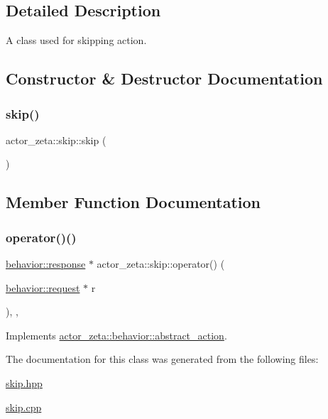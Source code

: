 \subsection{Detailed Description}
A class used for skipping action. 

\subsection{Constructor \& Destructor Documentation}
\mbox{\label{classactor__zeta_1_1skip_a2a649385cc43b90561bbd106aadf55fe}} 
\subsubsection{\texorpdfstring{skip()}{skip()}}
{\footnotesize\ttfamily actor\+\_\+zeta\+::skip\+::skip (\begin{DoxyParamCaption}{ }\end{DoxyParamCaption})}



\subsection{Member Function Documentation}
\mbox{\label{classactor__zeta_1_1skip_a0a674c6ce55d365b2bae8ec19a58e29f}} 
\subsubsection{\texorpdfstring{operator()()}{operator()()}}
{\footnotesize\ttfamily \hyperlink{classactor__zeta_1_1behavior_1_1response}{behavior\+::response} $\ast$ actor\+\_\+zeta\+::skip\+::operator() (\begin{DoxyParamCaption}\item[{\hyperlink{classactor__zeta_1_1behavior_1_1request}{behavior\+::request} $\ast$}]{r }\end{DoxyParamCaption})\hspace{0.3cm}{\ttfamily [final]}, {\ttfamily [override]}, {\ttfamily [virtual]}}



Implements \hyperlink{classactor__zeta_1_1behavior_1_1abstract__action_a5e48075d77fbd93615fc9b757e6a4d87}{actor\+\_\+zeta\+::behavior\+::abstract\+\_\+action}.



The documentation for this class was generated from the following files\+:\begin{DoxyCompactItemize}
\item 
\hyperlink{skip_8hpp}{skip.\+hpp}\item 
\hyperlink{skip_8cpp}{skip.\+cpp}\end{DoxyCompactItemize}
